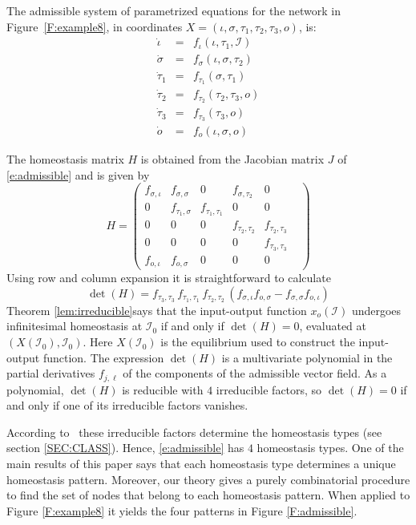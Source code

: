 \documentclass[a4paper,fleqn]{cas-dc}
\newcommand{\II}{{\mathcal I}}
\begin{document}
The admissible system of parametrized equations for the network in Figure~\ref{F:example8}, in coordinates  $X = (\iota, \sigma, \tau_1,\tau_2, \tau_3, o)$, is:
\begin{equation} \label{e:admissible}
\begin{array}{ccl}
\dot{\iota} & = & f_\iota(\iota, \tau_1,\II) \\
\dot{\sigma} & = & f_\sigma(\iota, \sigma, \tau_2) \\
\dot{\tau}_1 & = & f_{\tau_1}(\sigma,\tau_1) \\
\dot{\tau}_2 & = & f_{\tau_2}(\tau_2,\tau_3,o) \\
\dot{\tau}_3 & = & f_{\tau_3}(\tau_3,o) \\
\dot{o} & = & f_o(\iota, \sigma,o)
\end{array}
\end{equation}

The homeostasis matrix $H$ is obtained from the Jacobian matrix $J$ of \eqref{e:admissible} and is given by
\[
H = \begin{pmatrix}
f_{\sigma,\iota} & f_{\sigma,\sigma} & 0 & f_{\sigma,\tau_2} & 0\\  
 0 & f_{\tau_1, \sigma} &  f_{\tau_1, \tau_1} & 0 & 0 & \\ 
 0 & 0 & 0 & f_{\tau_2,\tau_2} & f_{\tau_2,\tau_3} \\  
0 & 0 & 0 & 0& f_{\tau_3,\tau_3} \\
f_{o,\iota} & f_{o,\sigma} & 0 & 0 & 0 
\end{pmatrix}
\]
Using row and column expansion it is straightforward to calculate
\begin{equation}  \label{H:example8}
\det(H) = f_{\tau_3,\tau_3} \, f_{\tau_1,\tau_1} \, f_{\tau_2,\tau_2} \,
(f_{\sigma,\iota} f_{o,\sigma} - f_{\sigma,\sigma} f_{o,\iota})  
\end{equation}
Theorem \ref{lem:irreducible}says that the input-output function $x_o(\II)$ undergoes infinitesimal homeostasis at $\II_0$ if and only if $\det(H) = 0$, evaluated at $(X(\II_0),\II_0)$.  
Here $X(\II_0)$ is the equilibrium used to construct the input-output function.  
The expression $\det(H)$ is a multivariate polynomial in the partial derivatives $f_{j,\ell}$ of the components of the admissible vector field.  
As a polynomial, $\det(H)$ is reducible with $4$ irreducible factors, so $\det(H)=0$ if and only if one of its irreducible factors vanishes.

According to~\cite{wang2021} these irreducible factors determine the homeostasis types (see section  \ref{SEC:CLASS}).
Hence, \eqref{e:admissible} has $4$ homeostasis types.  One of the main results of this paper says that each homeostasis type determines a unique homeostasis pattern.
Moreover, our theory gives a purely combinatorial procedure to find the set of nodes that belong to each homeostasis pattern.  
When applied to Figure \ref{F:example8} it yields the four patterns in Figure \ref{F:admissible}.
\end{document}

